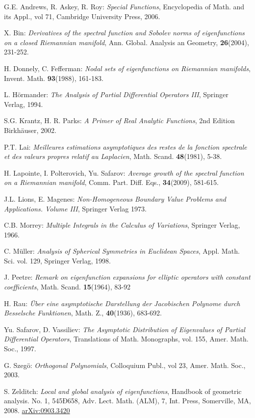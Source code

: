 \documentclass[reqno, 11pt]{amsart}
\theoremstyle{definition}
\numberwithin{equation}{section}
\begin{document}
\begin{thebibliography}{XXXXX}

 G.E. Andrews, R. Askey, R. Roy: {\sl Special Functions}, Encyclopedia of Math. and its Appl., vol 71, Cambridge University Press, 2006.

 X. Bin: {\sl  Derivatives of the spectral function and Sobolev norms of eigenfunctions on a closed Riemannian manifold}, Ann. Global. Analysis an Geometry, {\bf 26}(2004), 231-252.

 H. Donnely, C. Fefferman: {\sl Nodal sets of eigenfunctions on Riemannian manifolds}, Invent. Math. {\bf 93}(1988), 161-183.

 L. H\"{o}rmander: {\sl The Analysis of Partial Differential Operators III}, Springer Verlag, 1994.

 S.G. Krantz, H. R. Parks: {\sl A Primer of Real Analytic Functions}, 2nd Edition  Birkh\"{a}user, 2002.

 P.T. Lai: {\sl Meilleures estimations asymptotiques des restes de la fonction spectrale et des valeurs propres  relatif au Laplacien}, Math. Scand. {\bf 48}(1981), 5-38.

 H. Lapointe, I. Polterovich, Yu. Safarov: {\sl Average growth of the spectral function on a Riemannian manifold},  Comm. Part. Diff. Eqs., {\bf 34}(2009), 581-615.

 J.L. Lions,  E. Magenes: {\sl  Non-Homogeneous Boundary Value Problems and Applications.  Volume III}, Springer Verlag 1973. 

 C.B. Morrey: {\sl Multiple Integrals in the Calculus of Variations}, Springer Verlag, 1966.

  C. M\"{u}ller: {\sl  Analysis of Spherical Symmetries in Euclidean Spaces},   Appl. Math. Sci. vol. 129, Springer Verlag, 1998.

 J. Peetre: {\sl Remark on eigenfunction expansions for elliptic operators with constant coefficients}, Math. Scand. {\bf 15}(1964), 83-92

 H. Rau: {\sl \"{U}ber eine asymptotische Darstellung der Jacobischen Polynome durch Besselsche Funktionen},  Math. Z., {\bf 40}(1936), 683-692.

  Yu. Safarov, D. Vassiliev: {\sl The Asymptotic Distribution of Eigenvalues of Partial Differential Operators}, Translations of Math. Monographs, vol. 155, Amer. Math. Soc., 1997.

 G. Szeg\"{o}: {\sl  Orthogonal Polynomials}, Colloquium Publ., vol 23,  Amer. Math. Soc.,  2003.

 S. Zelditch: {\sl Local and global analysis of eigenfunctions}, Handbook of geometric analysis. No. 1, 545Ð658, Adv. Lect. Math. (ALM), 7, Int. Press, Somerville, MA, 2008. \href{http://front.math.ucdavis.edu/0903.3420}{arXiv:0903.3420}

\end{thebibliography}
\end{document}
